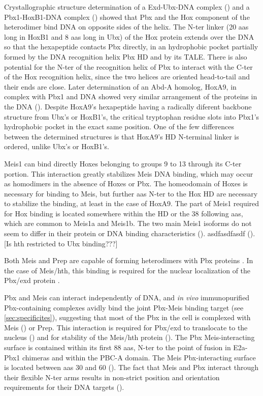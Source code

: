 Crystallographic structure determination of a Exd-Ubx-DNA complex (\cite{Passner1999}) and a Pbx1-HoxB1-DNA complex (\cite{Piper1999}) showed that Pbx and the Hox component of the heterodimer bind DNA on opposite sides of the helix. The \ac{N-ter} linker (20 \acp{aa} long in HoxB1 and 8 \acp{aa} long in Ubx) of the Hox protein extends over the DNA so that the hexapeptide contacts Pbx directly, in an hydrophobic pocket partially formed by the DNA recognition helix Pbx \ac{HD} and by its \ac{TALE}. There is also potential for the \ac{N-ter} of the recognition helix of Pbx to interact with the \ac{C-ter} of the Hox recognition helix, since the two helices are oriented head-to-tail and their ends are close. Later determination of an \ac{Abd-A} homolog, HoxA9, in complex with Pbx1 and DNA showed very similar arrangement of the proteins in the DNA (\cite{LaRonde-LeBlanc2003}). Despite HoxA9's hexapeptide having a radically diferent backbone structure from Ubx's or HoxB1's, the critical tryptophan residue slots into Pbx1's hydrophobic pocket in the exact same position. One of the few differences between the determined structures is that HoxA9's \ac{HD} N-terminal linker is ordered, unlike Ubx's or HoxB1's.


Meis1 can bind directly Hoxes belonging to groups 9 to 13 through its \ac{C-ter} portion. This interaction greatly stabilizes Meis DNA binding, which may occur as homodimers in the absence of Hoxes or Pbx. The homeodomain of Hoxes is necessary for binding to Meis, but further \acp{aa} \ac{N-ter} to the Hox \ac{HD} are necessary to stabilize the binding, at least in the case of HoxA9. The part of Meis1 required for Hox binding is located somewhere within the \ac{HD} or the 38 following \acp{aa}, which are common to Meis1a and Meis1b. The two main Meis1 isoforms do not seem to differ in their protein or DNA binding characteristics (\cite{Shen1997}). asdfasdfasdf (\cite{Williams2005}). [Is hth restricted to Ubx binding???]

Both Meis and Prep are capable of forming heterodimers with Pbx proteins \cite{Knoepfler1997}. In the case of Meis/\ac{hth}, this binding is required for the nuclear localization of the Pbx/\ac{exd} protein \cite{ref}.

Pbx and Meis can interact independently of DNA, and \textit{in vivo} immunopurified Pbx-containing complexes avidly bind the joint Pbx-Meis binding target (see \ref{sec:specificites}), suggesting that most of the Pbx in the cell is complexed with Meis (\cite{Chang1997}) or Prep. This interaction is required for Pbx/exd to translocate to the nucleus (\cite{Rieckhof1997}) and for stability of the Meis/hth protein (\cite{Abu-Shaar1998}). The Pbx Meis-interacting surface is contained within its first 88 \acp{aa}, \ac{N-ter} to the point of fusion in E2a-Pbx1 chimeras and within the PBC-A domain. The Meis Pbx-interacting surface is located between \acp{aa} 30 and 60 (\cite{Chang1997}). The fact that Meis and Pbx interact through their flexible \ac{N-ter} arms results in non-strict position and orientation requirements for their DNA targets (\cite{Jacobs1999}).

